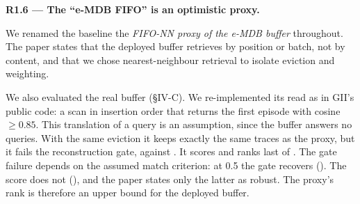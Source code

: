 \documentclass[11pt]{article}
\newcommand{\comment}[1]{\par\medskip\noindent\textbf{#1}\par}
\begin{document}
\comment{R1.6 --- The ``e-MDB FIFO'' is an optimistic proxy.}
We renamed the baseline the \emph{FIFO-NN proxy of the e-MDB buffer}
throughout. The paper states that the deployed buffer retrieves by position or
batch, not by content, and that we chose nearest-neighbour retrieval to isolate
eviction and weighting.

We also evaluated the real buffer (§IV-C). We re-implemented its read as in
GII's public code: a scan in insertion order that returns the first episode
with cosine $\geq 0.85$. This translation of a query is an assumption, since
the buffer answers no queries. With the same eviction it keeps exactly the
same traces as the proxy, but it fails the reconstruction gate,
against .
It scores
and ranks last of
.
The gate failure depends on the assumed match criterion: at 0.5 the gate
recovers
().
The score does not
(),
and the paper states only the latter as robust. The proxy's rank is therefore
an upper bound for the deployed buffer.
\end{document}
